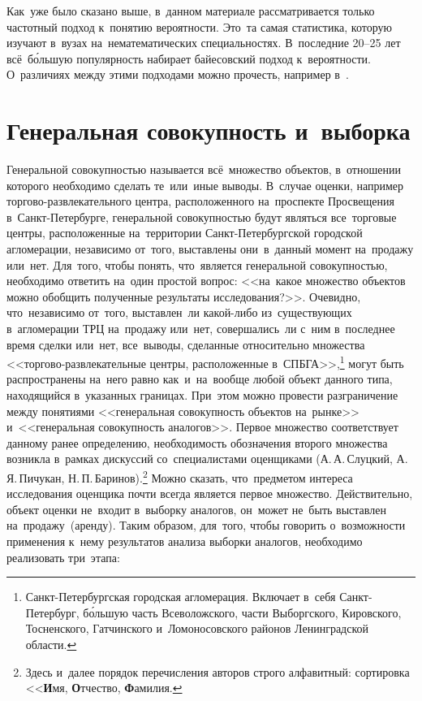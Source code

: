 \documentclass[]{scrartcl}
\begin{document}
Как~уже было сказано выше, в~данном материале рассматривается только частотный подход к~понятию вероятности. Это~та самая статистика, которую изучают в~вузах на~нематематических специальностях.   В~последние 20--25 лет всё~б\'ольшую популярность набирает байесовский подход к~вероятности. О~различиях между этими подходами можно прочесть, например в~\cite{Murashev:freq-baye-prob}.

\section{Генеральная совокупность и~выборка}
Генеральной совокупностью называется всё~множество объектов, в~отношении которого необходимо сделать те~или~иные выводы. В~случае оценки, например торгово-развлекательного центра, расположенного на~проспекте Просвещения в~Санкт-Петербурге, генеральной совокупностью будут являться все~торговые центры, расположенные на~территории Санкт-Петербургской городской агломерации, независимо от~того, выставлены они~в~данный момент на~продажу или~нет. Для~того, чтобы понять, что~является генеральной совокупностью, необходимо ответить на~один простой вопрос: <<на~какое множество объектов можно обобщить полученные результаты исследования?>>. Очевидно, что~независимо от~того, выставлен~ли какой-либо из~существующих в~агломерации ТРЦ на~продажу или~нет, совершались~ли с~ним в~последнее время сделки или~нет, все~выводы, сделанные относительно множества <<торгово-развлекательные центры, расположенные в~СПБГА>>,\footnote{Санкт-Петербургская городская агломерация. Включает в~себя Санкт-Петербург, б\'ольшую часть Всеволожского, части Выборгского, Кировского, Тосненского, Гатчинского и~Ломоносовского районов Ленинградской области.} могут быть распространены на~него равно как~и~на~вообще любой объект данного типа, находящийся в~указанных границах. При~этом можно провести разграничение между понятиями <<генеральная совокупность объектов на~рынке>> и~<<генеральная совокупность аналогов>>. Первое множество соответствует данному ранее определению, необходимость обозначения второго множества возникла в~рамках дискуссий со~специалистами оценщиками (А.\,А.\,Слуцкий, А.\,Я.\,Пичукан, Н.\,П.\,Баринов).\footnote{Здесь и~далее порядок перечисления авторов строго алфавитный: сортировка <<\textbf{И}мя, \textbf{О}тчество, \textbf{Ф}амилия.} Можно сказать, что~предметом интереса исследования оценщика почти всегда является первое множество. Действительно, объект оценки не~входит в~выборку аналогов, он~может не~быть выставлен на~продажу~(аренду). Таким образом, для~того, чтобы говорить о~возможности применения к~нему результатов анализа выборки аналогов, необходимо реализовать три~этапа:
\end{document}
